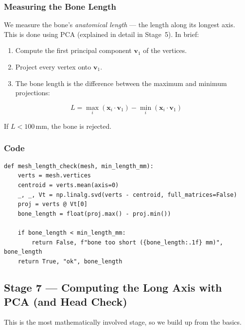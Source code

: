 \documentclass[12pt,a4paper]{article}
\begin{document}
\subsubsection{Measuring the Bone Length}

We measure the bone's \emph{anatomical length} — the length along its longest
axis.  This is done using PCA (explained in detail in Stage~5).  In brief:

\begin{enumerate}
    \item Compute the first principal component $\mathbf{v}_1$ of the vertices.
    \item Project every vertex onto $\mathbf{v}_1$.
    \item The bone length is the difference between the maximum and minimum
          projections:
\end{enumerate}

\begin{equation}
    \boxed{
        L = \max_i(\mathbf{x}_i \cdot \mathbf{v}_1)
          - \min_i(\mathbf{x}_i \cdot \mathbf{v}_1)
    }
    \label{eq:length}
\end{equation}

If $L < 100$\,mm, the bone is rejected.

\subsubsection{Code}

\begin{lstlisting}
def mesh_length_check(mesh, min_length_mm):
    verts = mesh.vertices
    centroid = verts.mean(axis=0)
    _, _, Vt = np.linalg.svd(verts - centroid, full_matrices=False)
    proj = verts @ Vt[0]
    bone_length = float(proj.max() - proj.min())

    if bone_length < min_length_mm:
        return False, f"bone too short ({bone_length:.1f} mm)", bone_length
    return True, "ok", bone_length
\end{lstlisting}


\subsection{Stage 7 — Computing the Long Axis with PCA (and Head Check)}
\label{sec:pca}

This is the most mathematically involved stage, so we build up from the basics.
\end{document}
